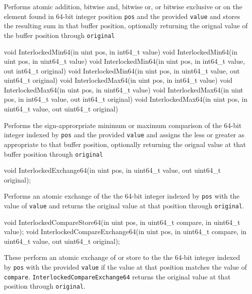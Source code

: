 Performs atomic addition, bitwise and, bitwise or, or bitwise exclusive or
on the element found in 64-bit integer position \texttt{pos} and the provided \texttt{value}
and stores the resulting sum in that buffer position,
optionally returning the orignal value of the buffer position through \texttt{original}

\begin{HLSL}
   void InterlockedMin64(in uint pos, in int64_t value)
   void InterlockedMin64(in uint pos, in uint64_t value)
   void InterlockedMin64(in uint pos, in int64_t value, out int64_t original)
   void InterlockedMin64(in uint pos, in uint64_t value, out uint64_t original)
   void InterlockedMax64(in uint pos, in int64_t value)
   void InterlockedMax64(in uint pos, in uint64_t value)
   void InterlockedMax64(in uint pos, in int64_t value, out int64_t original)
   void InterlockedMax64(in uint pos, in uint64_t value, out uint64_t original)
\end{HLSL}

Performs the sign-approrpriate minimum or maximum comparison of the 64-bit integer indexed by \texttt{pos}
and the provided \texttt{value} and assigns the less or greater as appropriate to that buffer position,
optionally returning the orignal value at that buffer position through \texttt{original}

\begin{HLSL}
   void InterlockedExchange64(in uint pos, in uint64_t value, out uint64_t original);
\end{HLSL}

Performs an atomic exchange of the the 64-bit integer indexed by \texttt{pos} with
the value of \texttt{value} and returns the original value at that position through \texttt{original}.

\begin{HLSL}
   void InterlockedCompareStore64(in uint pos, in uint64_t compare,
                                   in uint64_t value);
   void InterlockedCompareExchange64(in uint pos, in uint64_t compare,
                                      in uint64_t value, out uint64_t original);
\end{HLSL}

These perform an atomic exchange of or store to the the 64-bit integer indexed by \texttt{pos}
with the provided \texttt{value} if the value at that position matches the value of \texttt{compare}.
\texttt{InterlockedCompareExchange64} returns the original value at that position through \texttt{original}.

